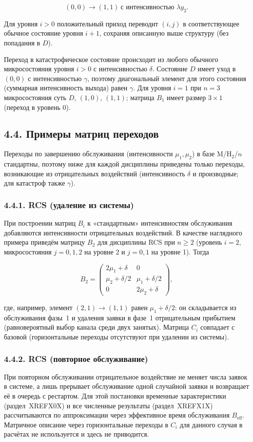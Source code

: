 \[(0,0)\to(1,1)\ \text{с интенсивностью }\lambda y_2.\]


Для уровня \(i>0\) положительный приход переводит \((i,j)\) в соответствующее обычное состояние уровня \(i+1\), сохраняя описанную выше структуру (без попадания в \(D\)).

Переход в катастрофическое состояние происходит из любого обычного микросостояния уровня \(i>0\) с интенсивностью \(\delta\). Состояние \(D\) имеет уход в \((0,0)\) с интенсивностью \(\gamma\), поэтому диагональный элемент для этого состояния (суммарная интенсивность выхода) равен \(\gamma\). Для уровня \(i=1\) при \(n=3\) микросостояния суть \(D\), \((1,0)\), \((1,1)\); матрица \(B_1\) имеет размер \(3\times 1\) (переход в уровень 0).

\subsection*{4.4. Примеры матриц переходов}
Переходы по завершению обслуживания (интенсивности \(\mu_1,\mu_2\)) в базе M/H\(_2\)/\(n\) стандартны, поэтому ниже для каждой дисциплины приведены только переходы, возникающие из отрицательных воздействий (интенсивность \(\delta\) и производные; для катастроф также \(\gamma\)).

\subsubsection*{4.4.1. RCS (удаление из системы)}
При построении матриц \(B_i\) к «стандартным» интенсивностям обслуживания добавляются интенсивности отрицательных воздействий. В качестве наглядного примера приведём матрицу \(B_2\) для дисциплины RCS при \(n\ge 2\) (уровень \(i=2\), микросостояния \(j=0,1,2\) на уровне 2 и \(j=0,1\) на уровне 1). Тогда


\[B_2=
\begin{pmatrix}
2\mu_1+\delta & 0\\
\mu_2+\delta/2 & \mu_1+\delta/2\\
0 & 2\mu_2+\delta
\end{pmatrix},\]


где, например, элемент \((2,1)\to(1,1)\) равен \(\mu_1+\delta/2\): он складывается из обслуживания фазы~1 и удаления заявки в фазе~1 отрицательным прибытием (равновероятный выбор канала среди двух занятых). Матрица \(C_i\) совпадает с базовой (горизонтальные переходы отсутствуют при удалении из системы).

\subsubsection*{4.4.2. RCS (повторное обслуживание)}
При повторном обслуживании отрицательное воздействие не меняет числа заявок в системе, а лишь прерывает обслуживание одной случайной заявки и возвращает её в очередь с рестартом. Для этой постановки временные характеристики (раздел~XREFX0X) и все численные результаты (раздел~XREFX1X) рассчитываются по аппроксимации через эффективное время обслуживания \(B_{\mathrm{eff}}\). Матричное описание через горизонтальные переходы в \(C_i\) для данного случая в расчётах не используется и здесь не приводится.

